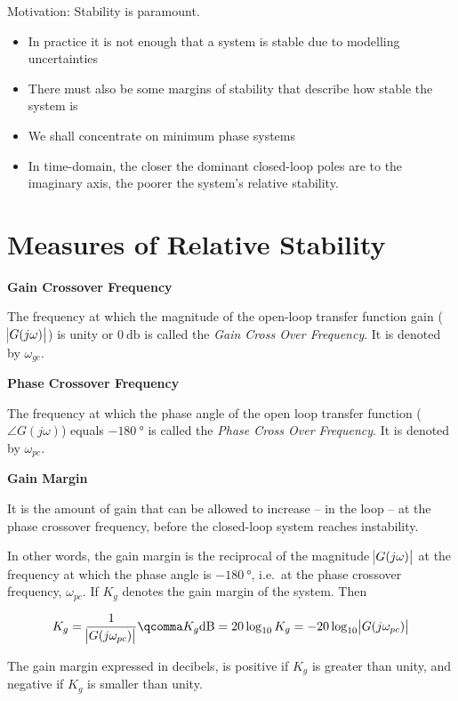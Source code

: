 \documentclass[
  14pt,
  a4paper,
  oneside,
  open=any,
  a4paper,
  14pt]{report}
\providecommand{\tightlist}{%
  \setlength{\itemsep}{0pt}\setlength{\parskip}{0pt}}\usepackage{longtable,booktabs,array}
\begin{document}
Motivation: Stability is paramount.

\begin{itemize}
\tightlist
\item
  In practice it is not enough that a system is stable due to modelling
  uncertainties
\item
  There must also be some margins of stability that describe how stable
  the system is
\item
  We shall concentrate on minimum phase systems
\item
  In time-domain, the closer the dominant closed-loop poles are to the
  imaginary axis, the poorer the system's relative stability.
\end{itemize}

\section{Measures of Relative
Stability}\label{measures-of-relative-stability}

\textbf{\textbf{Gain Crossover Frequency}}

The frequency at which the magnitude of the open-loop transfer function
gain (\(\abs{G(j\omega)}\)) is unity or \(\SI{0}{\decibel}\) is called
the \emph{Gain Cross Over Frequency}. It is denoted by \(\omega_{gc}\).

\textbf{\textbf{Phase Crossover Frequency}}

The frequency at which the phase angle of the open loop transfer
function (\(\angle G(j\omega)\)) equals \(-\SI{180}{\degree}\) is called
the \emph{Phase Cross Over Frequency}. It is denoted by \(\omega_{pc}\).

\textbf{\textbf{Gain Margin}}

It is the amount of gain that can be allowed to increase -- in the loop
-- at the phase crossover frequency, before the closed-loop system
reaches instability.

In other words, the gain margin is the reciprocal of the magnitude
\(\abs{G(j\omega)}\) at the frequency at which the phase angle is
\(-\SI{180}{\degree}\), i.e.~at the phase crossover frequency,
\(\omega_{pc}\). If \(K_g\) denotes the gain margin of the system. Then

\[
    K_g = \dfrac{1}{\abs{G(j\omega_{pc})}}\qcomma K_g \unit{\decibel} = 20\log_{10} K_g = -20\log_{10}\abs{G(j\omega_{pc})}
\]

The gain margin expressed in decibels, is positive if \(K_g\) is greater
than unity, and negative if \(K_g\) is smaller than unity.
\end{document}
